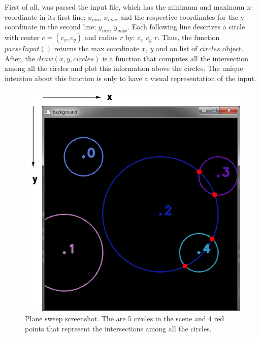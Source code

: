 \documentclass[12pt]{article}
\begin{document}
\noindent First of all, was parsed the input file, which has the minimum and maximum x-coordinate in its first line: $x_{min}$ $x_{max}$ and the respective coordinates for the y-coordinate in the second line: $y_{min}$ $y_{max}$. Each following line descrives a circle with center $c=(c_x, c_y)$ and radius $r$ by: $c_x$ $c_y$ $r$. Thus, the function $parseInput()$ returns the max coordinate $x$, $y$ and an list of $circles$ object. After, the $draw(x,y,circles)$ is a function that computes all the intersection among all the circles and plot this information above the circles. The unique intention about this function is only to have a visual representation of the input.

\begin{figure}[H]
	\centering
	\includegraphics[scale=0.5]{img/1.png}
	\caption{Plane sweep screenshot. The are 5 circles in the scene and 4 red points that represent the intersections among all the circles.} \label{fig:1b}
\end{figure}
\end{document}
